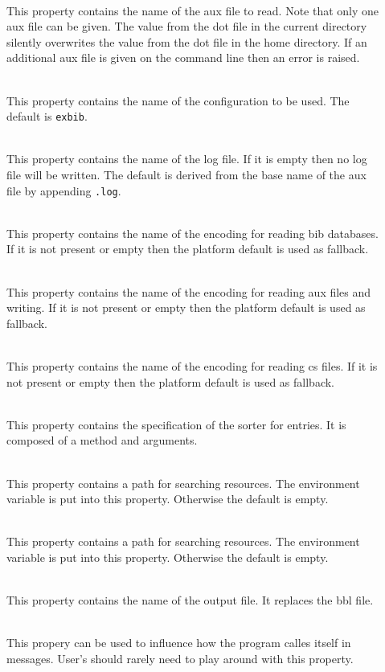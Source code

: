 \begin{description}
\item[] \ \\
  This property contains the name of the aux file to read. Note that
  only one aux file can be given. The value from the dot file in the
  current directory silently overwrites the value from the dot file in
  the home directory. If an additional aux file is given on the
  command line then an error is raised.
\item[] \ \\
  This property contains the name of the configuration to be used. The
  default is \texttt{exbib}.
\item[] \ \\
  This property contains the name of the log file. If it is empty then
  no log file will be written. The default is derived from the base
  name of the aux file by appending \texttt{.log}.
\item[] \ \\
  This property contains the name of the encoding for reading bib
  databases. If it is not present or empty then the platform default
  is used as fallback.
\item[] \ \\
  This property contains the name of the encoding for reading aux
  files and writing. If it is not present or empty then the platform
  default is used as fallback.
\item[] \ \\
  This property contains the name of the encoding for reading cs
  files. If it is not present or empty then the platform default is
  used as fallback.
\item[] \ \\
  This property contains the specification of the sorter for entries.
  It is composed of a method and arguments.
\item[] \ \\
  This property contains a path for searching resources. The
  environment variable  is put into this property.
  Otherwise the default is empty.
\item[]  \ \\
  This property contains a path for searching resources. The
  environment variable  is put into this property.
  Otherwise the default is empty.
\item[] \ \\
  This property contains the name of the output file. It replaces the
  bbl file.
\item[] \ \\
  This propery can be used to influence how the program calles itself
  in messages. User's should rarely need to play around with this
  property.
\end{description}

